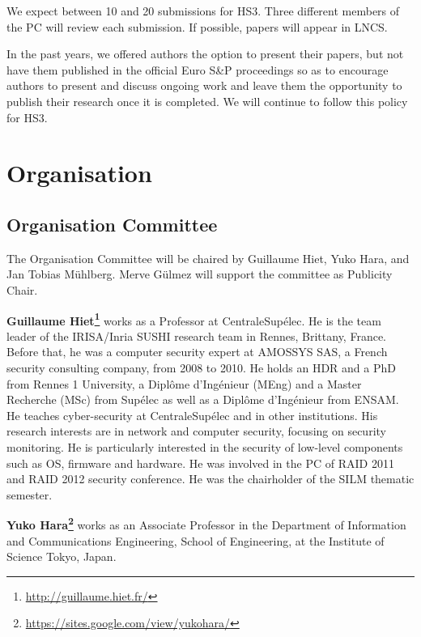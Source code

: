 \documentclass[a4paper,11pt]{article}
\begin{document}
We expect between 10 and 20 submissions for HS3. Three different members of the PC will review each submission.  If
possible, papers will appear in LNCS.

In the past years, we offered authors the option to present their papers, but
not have them published in the official Euro S\&P proceedings so as to
encourage authors to present and discuss ongoing work and leave them the
opportunity to publish their research once it is completed. We will continue to follow
this policy for HS3.


\section{Organisation}
%
\subsection{Organisation Committee}
%
The Organisation Committee will be chaired by Guillaume Hiet, Yuko Hara, and Jan Tobias
M\"uhlberg. Merve G\"ulmez will support the committee as Publicity Chair.

\textbf{Guillaume Hiet\footnote{\url{http://guillaume.hiet.fr/}}} works as a
Professor at CentraleSupélec. He is the team leader of the IRISA/Inria SUSHI research
team in Rennes, Brittany, France. Before that, he was a computer security
expert at AMOSSYS SAS, a French security consulting company, from 2008 to
2010. He holds an HDR and a PhD from Rennes 1 University, a Diplôme d'Ingénieur (MEng)
and a Master Recherche (MSc) from Supélec as well as a Diplôme d'Ingénieur
from ENSAM. He teaches cyber-security at CentraleSupélec and in other
institutions. His research interests are in network and computer security,
focusing on security monitoring. He is particularly interested in the
security of low-level components such as OS, firmware and hardware. He was
involved in the PC of RAID 2011 and RAID 2012 security conference. He was
the chairholder of the SILM thematic semester.

\textbf{Yuko Hara\footnote{\url{https://sites.google.com/view/yukohara/}}}  works as an Associate Professor in the Department of Information and Communications Engineering, School of Engineering, at the Institute of Science Tokyo, Japan.
\end{document}
